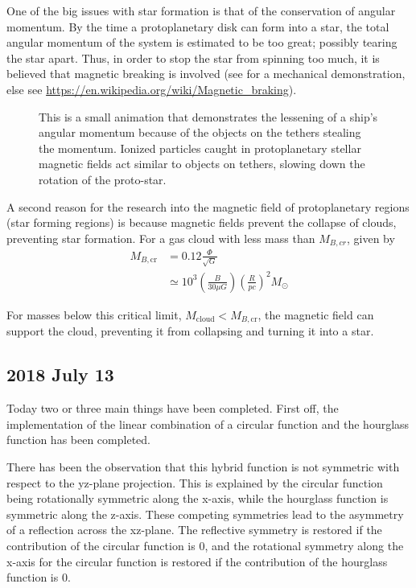 \documentclass[twocolumn]{article}
\begin{document}
One of the big issues with star formation is that of the conservation of angular momentum. By the time a protoplanetary disk can form into a star, the total angular momentum of the system is estimated to be too great; possibly tearing the star apart. Thus, in order to stop the star from spinning too much, it is believed that magnetic breaking is involved (see  for a mechanical demonstration, else see \url{https://en.wikipedia.org/wiki/Magnetic_braking}).

\begin{figure}
	\caption{This is a small animation that demonstrates the lessening of a ship's angular momentum because of the objects on the tethers stealing the momentum. Ionized particles caught in protoplanetary stellar magnetic fields act similar to objects on tethers, slowing down the rotation of the proto-star.}
	\label{fig:yoyo_despin_animation}
\end{figure}

A second reason for the research into the magnetic field of protoplanetary regions (star forming regions) is because magnetic fields prevent the collapse of clouds, preventing star formation. For a gas cloud with less mass than $M_{B,cr}$, given by
\begin{align*}
	M_{B,\text{cr}} &= 0.12 \frac{\Phi}{\sqrt{G}} \\ 
	& \simeq 10^3 \left( \frac{B}{30 \mu G} \right) \left( \frac{R}{pc} \right)^2 M_{\odot}
\end{align*}

For masses below this critical limit, $M_\text{cloud} < M_{B,\text{cr}}$, the magnetic field can support the cloud, preventing it from collapsing and turning it into a star. 


\subsection{2018 July 13}
\label{subsec:2018_July_13}

Today two or three main things have been completed. First off, the implementation of the linear combination of a circular function and the hourglass function has been completed.

There has been the observation that this hybrid function is not symmetric with respect to the yz-plane projection. This is explained by the circular function being rotationally symmetric along the x-axis, while the hourglass function is symmetric along the z-axis. These competing symmetries lead to the asymmetry of a reflection across the xz-plane. The reflective symmetry is restored if the contribution of the circular function is $0$, and the rotational symmetry along the x-axis for the circular function is restored if the contribution of the hourglass function is $0$.
\end{document}
